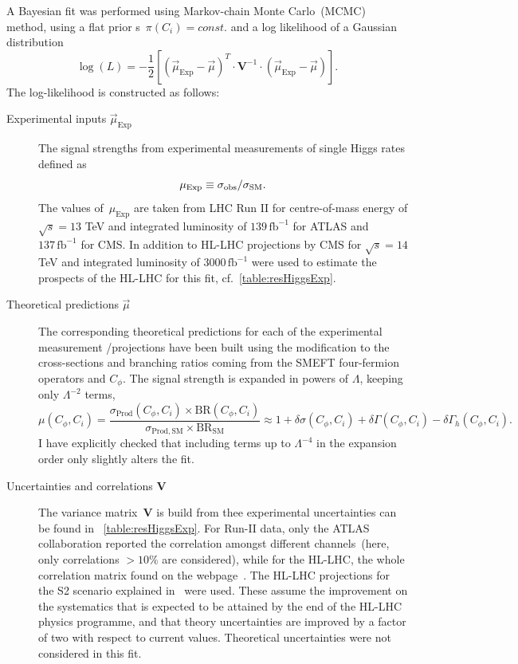 	
\par	A Bayesian fit was performed using Markov-chain Monte Carlo~(MCMC) method, using a flat prior s~$ \pi(C_i)= const.$ and a log likelihood of a Gaussian distribution 
	\begin{equation}
		\log(L) = -\frac{1}{2}\left[  (\vec{\mu}_{\mathrm{Exp}} -\vec{\mu} ) ^{T} \cdot \mathbf{V}^{-1} \cdot ( \vec{\mu}_{\mathrm{Exp}} -\vec{\mu} )\right]  .
		\label{eq:loglike}
	\end{equation}
	The log-likelihood is constructed as follows:
	\begin{description}
		\item[Experimental inputs $\vec{\mu}_{\mathrm{Exp}}$ ] The signal strengths from experimental measurements of single Higgs rates defined as
		\begin{equation}
			\mu_{\mathrm{Exp}}\equiv \sigma_{\mathrm{obs}}/\sigma_{\mathrm{SM}}.
		\end{equation}
		The values of~$	\mu_{\mathrm{Exp}}$ are taken from LHC Run II for centre-of-mass energy of $\sqrt{s} = 13$ TeV and  integrated luminosity of $ 139\, \mathrm{fb}^{-1}$ for ATLAS and  $ 137\,\mathrm{fb}^{-1}$ for CMS. In addition to HL-LHC projections by CMS for $\sqrt{s} = 14$ TeV and integrated luminosity of $ 3000\, \mathrm{fb}^{-1}$ were used to estimate the prospects of the HL-LHC for this fit, cf.~\autoref{table:resHiggsExp}.
		\item [Theoretical predictions $\vec{\mu}$ ]  The corresponding theoretical predictions for each of the experimental measurement /projections have been built using the modification to the cross-sections and branching ratios coming from the SMEFT four-fermion operators and $C_\phi$. The signal strength is expanded in powers of $\Lambda$, keeping only $ \Lambda^{-2}$ terms,
		\begin{equation}
			\mu(C_\phi,C_i)=\frac{\sigma_\mathrm{ Prod}(C_\phi,C_i) \times \mathrm{ BR}(C_\phi,C_i)}{\sigma_\mathrm{ Prod, SM}\times \mathrm{BR}_\mathrm{ SM}} \approx 1+\delta \sigma(C_\phi,C_i)+\delta\Gamma(C_\phi,C_i)-\delta \Gamma_h(C_\phi,C_i).
			\label{linear-mu}
		\end{equation}
	I have explicitly checked that including terms up to $\Lambda^{-4}$ in the expansion order only slightly alters the fit.
		\item [Uncertainties and correlations $\mathbf{V}$ ]  The variance matrix~$\mathbf{V}$ is build from thee experimental uncertainties can be found in ~\autoref{table:resHiggsExp}. For Run-II data, only the ATLAS collaboration reported the correlation amongst different channels~(here, only correlations $> 10\%$ are considered), while for the HL-LHC, the whole correlation matrix found on the webpage~\cite{twiki}.  The HL-LHC projections for the S2 scenario explained in~\cite{Cepeda:2019klc} were used. These assume the improvement on the systematics that is expected to be attained by the end of the HL-LHC physics programme, and that theory uncertainties are improved by a factor of two with respect to current values. Theoretical uncertainties were not considered in this fit.
	\end{description}
